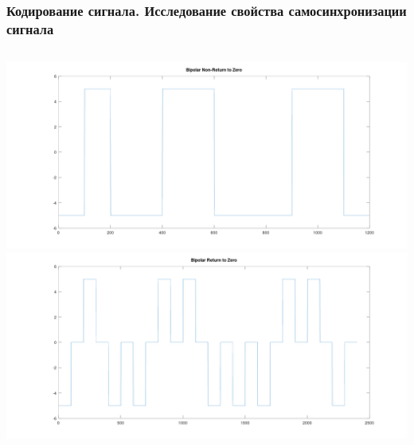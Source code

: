 \begin{frame}
\frametitle{Кодирование сигнала. Исследование свойства самосинхронизации сигнала}
\begin{columns}
            \includegraphics[width=\textwidth]{../octave/coding/signal/bipolarnrz.png}
            \includegraphics[width=\textwidth]{../octave/coding/signal/bipolarrz.png}
\end{columns}
\end{frame}


